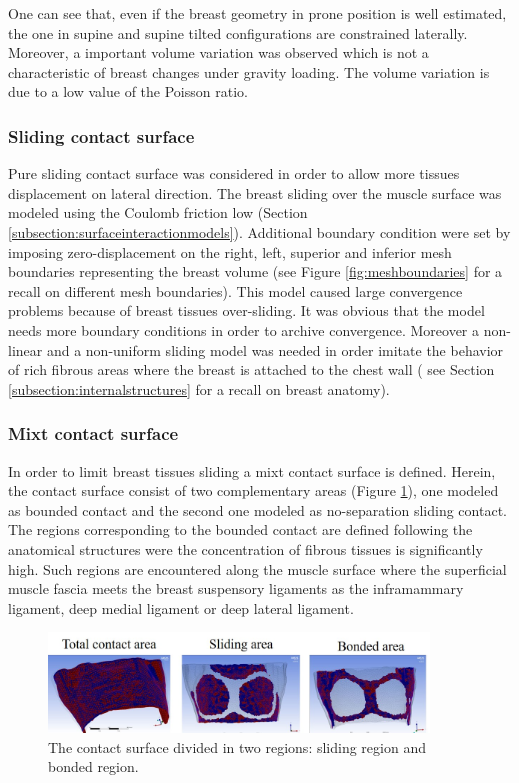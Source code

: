 One can see that, even if the breast geometry in prone position is well estimated, the one in supine and supine tilted configurations are constrained laterally. Moreover, a important volume variation was observed which is not a characteristic of breast changes under gravity loading. The volume variation is due to a low value of the Poisson ratio. 

\subsubsection*{Sliding contact surface}

Pure sliding contact surface was considered in order to allow more tissues displacement on lateral direction. The breast sliding over the muscle surface was modeled using the Coulomb friction low (Section \ref{subsection:surfaceinteractionmodels}). Additional boundary condition were set by imposing zero-displacement on the right, left, superior and inferior mesh boundaries representing the breast volume (see Figure \ref{fig:meshboundaries} for a recall on different mesh boundaries).  This model caused large convergence problems because of breast tissues over-sliding. It was obvious that the model needs more boundary conditions in order to archive convergence. Moreover a non-linear and a non-uniform sliding model was needed in order imitate the behavior of rich fibrous areas where the breast is attached to the chest wall ( see Section \ref{subsection:internalstructures} for a recall on breast anatomy). 


\subsubsection*{Mixt contact surface}

In order to limit breast tissues sliding a mixt contact surface is defined. Herein, the contact surface consist of two complementary areas (Figure \ref{fig:mixtcontact}), one modeled as bounded contact and the second one modeled as no-separation sliding contact. The regions corresponding to the bounded contact are defined following the anatomical structures were the concentration of fibrous tissues is significantly high. Such regions are encountered along the muscle surface where the superficial muscle fascia meets the breast suspensory ligaments as the inframammary ligament, deep medial ligament or deep lateral ligament.

\begin{figure}[!h]
\centering
\includegraphics[width=0.9\textwidth,keepaspectratio]{figures/mixtcontactarea.jpg} 
\caption{The contact surface divided in two regions: sliding region and bonded region.}
\label{fig:mixtcontact}
\end{figure}

